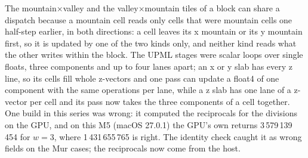 The mountain$\times$valley and the valley$\times$mountain tiles of a block can share a dispatch because a mountain
cell reads only cells that were mountain cells one half-step earlier, in both directions: a cell leaves its x mountain
or its y mountain first, so it is updated by one of the two kinds only, and neither kind reads what the other writes
within the block. The UPML stages were scalar loops over single floats, three components and up to four lanes apart;
an x or y slab has every z line, so its cells fill whole z-vectors and one pass can update a float4 of one component
with the same operations per lane, while a z slab has one lane of a z-vector per cell and its pass now takes the
three components of a cell together. One build in this series was wrong: it computed the reciprocals for the
divisions on the GPU, and on this M5 (macOS 27.0.1) the GPU's own  returns 3\,579\,139\,454 for
$w=3$, where 1\,431\,655\,765 is right. The identity check caught it as wrong fields on the Mur cases; the
reciprocals now come from the host.

